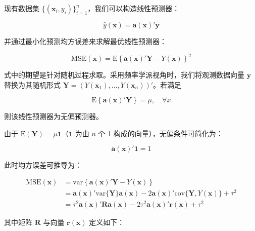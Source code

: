 \documentclass{ctexart}
\begin{document}
现有数据集 $\{(\boldsymbol{x}_i,y_i)\}_{i=1}^n$，我们可以构造线性预测器：

\begin{equation*}
\widehat{y}(\boldsymbol{x})=\boldsymbol{a}(\boldsymbol{x})'\boldsymbol{y}
\end{equation*}

并通过最小化预测均方误差来求解最优线性预测器：

\begin{equation*}
\mathrm{MSE}(\boldsymbol{x})=\mathrm{E}\left\{\boldsymbol{a}(\boldsymbol{x})'\boldsymbol{Y}-Y(\boldsymbol{x})\right\}^2
\tag{2.12}
\end{equation*}

式中的期望是针对随机过程求取。采用频率学派视角时，我们将观测数据向量 $\boldsymbol{y}$ 替换为其随机形式 $\boldsymbol{Y}=\left(Y(\boldsymbol{x}_1),\dots,Y(\boldsymbol{x}_n)\right)'$。若满足

\begin{equation*}
\mathrm{E}\left\{\boldsymbol{a}(\boldsymbol{x})'\boldsymbol{Y}\right\}=\mu,\quad\forall x
\end{equation*}

则该线性预测器为无偏预测器。

由于 $\mathrm{E}(\boldsymbol{Y})=\mu\boldsymbol{1}$（$\boldsymbol{1}$ 为由 $n$ 个 1 构成的向量），无偏条件可简化为：

\begin{equation*}
\boldsymbol{a}(\boldsymbol{x})'\boldsymbol{1}=1
\end{equation*}

此时均方误差可推导为：

\begin{align*}
\mathrm{MSE}(\boldsymbol{x})&=\mathrm{var}\left\{\boldsymbol{a}(\boldsymbol{x})'\boldsymbol{Y}-Y(\boldsymbol{x})\right\}\\
&=\boldsymbol{a}(\boldsymbol{x})'\mathrm{var}\{\boldsymbol{Y}\}\boldsymbol{a}(\boldsymbol{x})-2\boldsymbol{a}(\boldsymbol{x})'\mathrm{cov}\{\boldsymbol{Y},Y(\boldsymbol{x})\}+\tau^2\\
&=\tau^2\boldsymbol{a}(\boldsymbol{x})'\boldsymbol{R}\boldsymbol{a}(\boldsymbol{x})-2\tau^2\boldsymbol{a}(\boldsymbol{x})'\boldsymbol{r}(\boldsymbol{x})+\tau^2
\end{align*}

其中矩阵 $\boldsymbol{R}$ 与向量 $\boldsymbol{r}(\boldsymbol{x})$ 定义如下：
\end{document}
